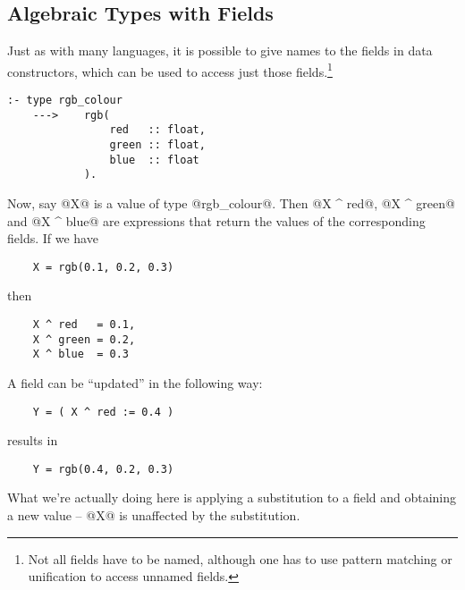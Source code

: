 \subsection{Algebraic Types with Fields}
Just as with many languages, it is possible to give names to
the fields in data constructors, which can be used to access
just those fields.\footnote{Not all fields have to be named, although one has
to use pattern matching or unification to access unnamed
fields.}
\begin{verbatim}
:- type rgb_colour
    --->    rgb(
                red   :: float,
                green :: float,
                blue  :: float
            ).
\end{verbatim}
Now, say @X@ is a value of type @rgb_colour@.  Then @X ^ red@,
@X ^ green@ and @X ^ blue@ are expressions that return the values
of the corresponding fields.  If we have
\begin{verbatim}
    X = rgb(0.1, 0.2, 0.3)
\end{verbatim}
then
\begin{verbatim}
    X ^ red   = 0.1,
    X ^ green = 0.2,
    X ^ blue  = 0.3
\end{verbatim}
A field can be ``updated'' in the following way:
\begin{verbatim}
    Y = ( X ^ red := 0.4 )
\end{verbatim}
results in
\begin{verbatim}
    Y = rgb(0.4, 0.2, 0.3)
\end{verbatim}
What we're actually doing here is applying a substitution to
a field and obtaining a new value -- @X@ is unaffected by the
substitution.

